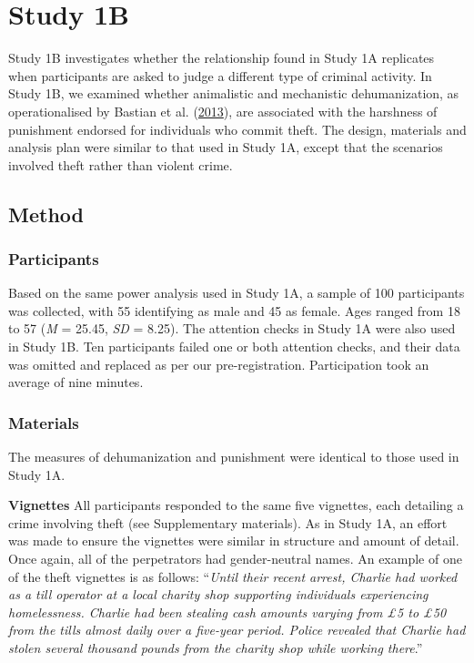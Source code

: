 \documentclass[
]{article}
\begin{document}
\hypertarget{study-1b}{%
\section{Study 1B}\label{study-1b}}

Study 1B investigates whether the relationship found in Study 1A replicates when participants are asked to judge a different type of criminal activity. In Study 1B, we examined whether animalistic and mechanistic dehumanization, as operationalised by Bastian et al. (\protect\hyperlink{ref-Bastian2013}{2013}), are associated with the harshness of punishment endorsed for individuals who commit theft. The design, materials and analysis plan were similar to that used in Study 1A, except that the scenarios involved theft rather than violent crime.

\hypertarget{method}{%
\subsection{Method}\label{method}}

\hypertarget{participants-1}{%
\subsubsection{Participants}\label{participants-1}}

Based on the same power analysis used in Study 1A, a sample of 100 participants was collected, with 55 identifying as male and 45 as female. Ages ranged from 18 to 57 (\emph{M} = 25.45, \emph{SD} = 8.25). The attention checks in Study 1A were also used in Study 1B. Ten participants failed one or both attention checks, and their data was omitted and replaced as per our pre-registration. Participation took an average of nine minutes.

\hypertarget{materials-1}{%
\subsubsection{Materials}\label{materials-1}}

The measures of dehumanization and punishment were identical to those used in Study 1A.

\textbf{Vignettes} All participants responded to the same five vignettes, each detailing a crime involving theft (see Supplementary materials). As in Study 1A, an effort was made to ensure the vignettes were similar in structure and amount of detail. Once again, all of the perpetrators had gender-neutral names. An example of one of the theft vignettes is as follows: ``\emph{Until their recent arrest, Charlie had worked as a till operator at a local charity shop supporting individuals experiencing homelessness. Charlie had been stealing cash amounts varying from £5 to £50 from the tills almost daily over a five-year period. Police revealed that Charlie had stolen several thousand pounds from the charity shop while working there}.''
\end{document}
